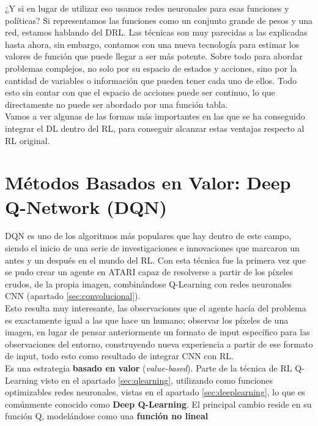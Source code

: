 \documentclass[11pt,fleqn]{book} %
\begin{document}
¿Y si en lugar de utilizar eso usamos redes neuronales para esas funciones y políticas? Si representamos las funciones como un conjunto grande de pesos y una red, estamos hablando del DRL. Las técnicas son muy parecidas a las explicadas hasta ahora, sin embargo, contamos con una nueva tecnología para estimar los valores de función que puede llegar a ser más potente. Sobre todo para abordar problemas complejos, no solo por su espacio de estados y acciones, sino por la cantidad de variables o información que pueden tener cada uno de ellos. Todo esto sin contar con que el espacio de acciones puede ser continuo, lo que directamente no puede ser abordado por una función tabla. \\

Vamos a ver algunas de las formas más importantes en las que se ha conseguido integrar el DL dentro del RL, para conseguir alcanzar estas ventajas respecto al RL original.

\section{Métodos Basados en Valor: Deep Q-Network (DQN)}\label{sec:DQN}

DQN \cite{article:DQN} \cite{article:DQN2} es uno de los algoritmos más populares que hay dentro de este campo, siendo el inicio de una serie de investigaciones e innovaciones que marcaron un antes y un después en el mundo del RL. Con esta técnica fue la primera vez que se pudo crear un agente en ATARI capaz de resolverse a partir de los píxeles crudos, de la propia imagen, combinándose Q-Learning con redes neuronales CNN (apartado \ref{sec:convolucional}). \\
 
Esto resulta muy interesante, las observaciones que el agente hacía del problema es exactamente igual a las que hace un humano; observar los píxeles de una imagen, en lugar de pensar anteriormente un formato de input específico para las observaciones del entorno, construyendo nueva experiencia a partir de ese formato de input, todo esto como resultado de integrar CNN con RL. \\

Es una estrategia \textbf{basado en valor} (\textit{value-based}). Parte de la técnica de RL Q-Learning visto en el apartado \ref{sec:qlearning}, utilizando como funciones optimizables redes neuronales, vistas en el apartado \ref{sec:deeplearning}, lo que es comúnmente conocido como \textbf{Deep Q-Learning}. El principal cambio reside en su función Q, modelándose como una \textbf{función no lineal}\\
\end{document}
